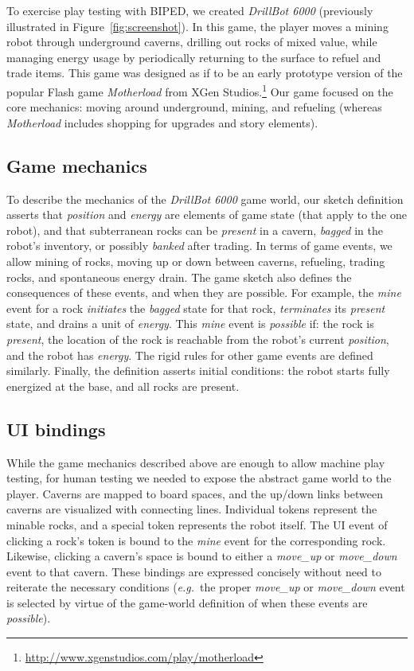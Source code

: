 \documentclass[letterpaper]{article}
\begin{document}
To exercise play testing with BIPED, we created \emph{DrillBot 6000}
(previously illustrated in Figure~\ref{fig:screenshot}).  In this game, the
player moves a mining robot through underground caverns, drilling out rocks of
mixed value, while managing energy usage by periodically returning to the
surface to refuel and trade items. This game was designed as if to be an early
prototype version of the popular Flash game \emph{Motherload} from XGen
Studios.\footnote{\url{http://www.xgenstudios.com/play/motherload}} Our game
focused on the core mechanics: moving around underground, mining, and refueling
(whereas \emph{Motherload} includes shopping for upgrades and story elements).

\subsection{Game mechanics}

To describe the mechanics of the \emph{DrillBot 6000} game world, our 
sketch definition asserts that \emph{position} and \emph{energy} are elements
of game state (that apply to the one robot), and that subterranean rocks can be
\emph{present} in a cavern, \emph{bagged} in the robot's inventory, or
possibly \emph{banked} after trading. In terms of game events, we allow
mining of rocks, moving up or down between caverns, refueling, trading rocks,
and spontaneous energy drain. The game sketch also defines the consequences of
these events, and when they are possible. For example, the
\emph{mine} event for a rock \emph{initiates} the \emph{bagged} state for
that rock, \emph{terminates} its \emph{present} state, and drains a unit
of \emph{energy}. This \emph{mine} event is \emph{possible} if: the rock
is \emph{present}, the location of the rock is reachable from the robot's
current \emph{position}, and the robot has \emph{energy}. The rigid rules
for other game events are defined similarly. Finally, the definition asserts
initial conditions: the robot starts fully energized at the base, and all rocks
are present.

\subsection{UI bindings}

While the game mechanics described above are enough to allow machine play
testing, for human testing we needed to expose the abstract game world to
the player. Caverns are mapped to board spaces, and
the up/down links between caverns are visualized with connecting lines.
Individual tokens represent the minable rocks, and a special token represents
the robot itself. The UI event of clicking a rock's token is bound to the
\emph{mine} event for the corresponding rock. Likewise, clicking a cavern's
space is bound to either a \emph{move\_up} or \emph{move\_down} event to that
cavern. These bindings are expressed concisely without need to reiterate the
necessary conditions (\emph{e.g.}\ the
proper \emph{move\_up} or \emph{move\_down} event is selected by virtue of
the game-world definition of when these events are \emph{possible}).
\end{document}

